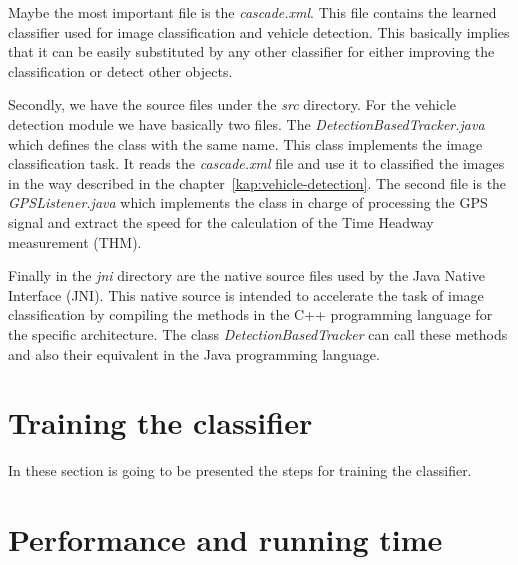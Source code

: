 Maybe the most important file is the \textit{cascade.xml}. This file contains
the learned classifier used for image classification and vehicle detection. This
basically implies that it can be easily substituted by any other classifier for
either improving the classification or detect other objects.

Secondly, we have the source files under the \textit{src} directory. For the
vehicle detection module we have basically two files. The
\textit{DetectionBasedTracker.java} which defines the class with the same name.
This class implements the image classification task. It reads the
\textit{cascade.xml} file and use it to classified the images in the way
described in the chapter~\ref{kap:vehicle-detection}. The second file is the
\textit{GPSListener.java} which implements the class in charge of processing the
GPS signal and extract the speed for the calculation of the Time Headway
measurement (THM). 

Finally in the \textit{jni} directory are the native source files used by the
Java Native Interface (JNI). This native source is intended to accelerate the
task of image classification by compiling the methods in the C++ programming
language for the specific architecture. The class \textit{DetectionBasedTracker} 
can call these methods and also their equivalent in the Java programming
language.


\section{Training the classifier} %
\label{sec:trainingClasssifier}

In these section is going to be presented the steps for training the classifier. 


\section{Performance and running time} %
\label{sec:running-time}





